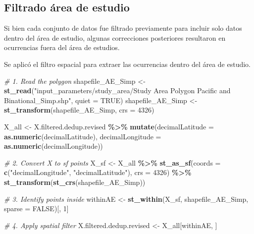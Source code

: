 \documentclass[sn-apa,pdflatex]{sn-jnl}
\newenvironment{Shaded}{\begin{snugshade}}{\end{snugshade}}
\newcommand{\AttributeTok}[1]{\textcolor[rgb]{0.13,0.29,0.53}{#1}}
\newcommand{\CommentTok}[1]{\textcolor[rgb]{0.56,0.35,0.01}{\textit{#1}}}
\newcommand{\ConstantTok}[1]{\textcolor[rgb]{0.56,0.35,0.01}{#1}}
\newcommand{\DecValTok}[1]{\textcolor[rgb]{0.00,0.00,0.81}{#1}}
\newcommand{\FunctionTok}[1]{\textcolor[rgb]{0.13,0.29,0.53}{\textbf{#1}}}
\newcommand{\NormalTok}[1]{#1}
\newcommand{\OtherTok}[1]{\textcolor[rgb]{0.56,0.35,0.01}{#1}}
\newcommand{\SpecialCharTok}[1]{\textcolor[rgb]{0.81,0.36,0.00}{\textbf{#1}}}
\newcommand{\StringTok}[1]{\textcolor[rgb]{0.31,0.60,0.02}{#1}}
\begin{document}
\subsection{Filtrado área de
estudio}\label{filtrado-uxe1rea-de-estudio-10}

Si bien cada conjunto de datos fue filtrado previamente para incluir
solo datos dentro del área de estudio, algunas correcciones posteriores
resultaron en ocurrencias fuera del área de estudios.

Se aplicó el filtro espacial para extraer las ocurrencias dentro del
área de estudio.

\begin{Shaded}
\begin{Highlighting}[]
\CommentTok{\# 1. Read the polygon}
\NormalTok{shapefile\_AE\_Simp }\OtherTok{\textless{}{-}} \FunctionTok{st\_read}\NormalTok{(}\StringTok{"input\_parameters/study\_area/Study Area Polygon Pacific and Binational\_Simp.shp"}\NormalTok{,}
    \AttributeTok{quiet =} \ConstantTok{TRUE}\NormalTok{)}
\NormalTok{shapefile\_AE\_Simp }\OtherTok{\textless{}{-}} \FunctionTok{st\_transform}\NormalTok{(shapefile\_AE\_Simp, }\AttributeTok{crs =} \DecValTok{4326}\NormalTok{)}

\NormalTok{X\_all }\OtherTok{\textless{}{-}}\NormalTok{ X.filtered.dedup.revised }\SpecialCharTok{\%\textgreater{}\%}
    \FunctionTok{mutate}\NormalTok{(}\AttributeTok{decimalLatitude =} \FunctionTok{as.numeric}\NormalTok{(decimalLatitude), }\AttributeTok{decimalLongitude =} \FunctionTok{as.numeric}\NormalTok{(decimalLongitude))}

\CommentTok{\# 2. Convert X to sf points}
\NormalTok{X\_sf }\OtherTok{\textless{}{-}}\NormalTok{ X\_all }\SpecialCharTok{\%\textgreater{}\%}
    \FunctionTok{st\_as\_sf}\NormalTok{(}\AttributeTok{coords =} \FunctionTok{c}\NormalTok{(}\StringTok{"decimalLongitude"}\NormalTok{, }\StringTok{"decimalLatitude"}\NormalTok{),}
        \AttributeTok{crs =} \DecValTok{4326}\NormalTok{) }\SpecialCharTok{\%\textgreater{}\%}
    \FunctionTok{st\_transform}\NormalTok{(}\FunctionTok{st\_crs}\NormalTok{(shapefile\_AE\_Simp))}

\CommentTok{\# 3. Identify points inside}
\NormalTok{withinAE }\OtherTok{\textless{}{-}} \FunctionTok{st\_within}\NormalTok{(X\_sf, shapefile\_AE\_Simp, }\AttributeTok{sparse =} \ConstantTok{FALSE}\NormalTok{)[,}
    \DecValTok{1}\NormalTok{]}

\CommentTok{\# 4. Apply spatial filter}
\NormalTok{X.filtered.dedup.revised }\OtherTok{\textless{}{-}}\NormalTok{ X\_all[withinAE, ]}
\end{Highlighting}
\end{Shaded}
\end{document}
